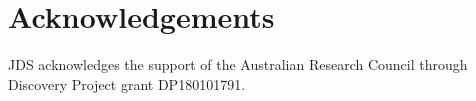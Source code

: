 \documentclass[fleqn,usenatbib,letters]{mnras}
\begin{document}
\section*{Acknowledgements}

JDS acknowledges the support of the Australian Research Council through Discovery Project grant DP180101791.












\bsp	%
\label{lastpage}
\end{document}
